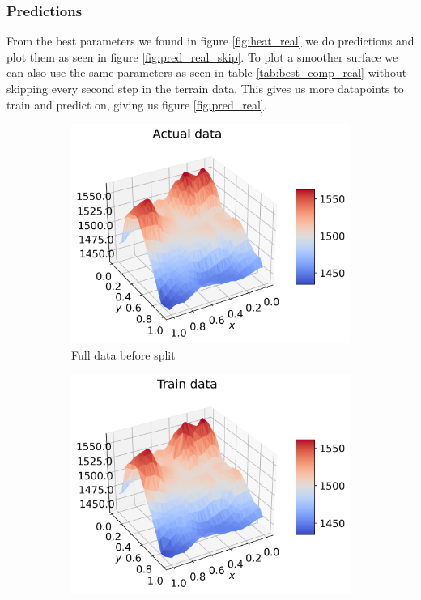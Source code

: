 \documentclass[12pt]{article}
\begin{document}
\subsubsection{Predictions}
From the best parameters we found in figure \ref{fig:heat_real} we do predictions and plot them as seen in figure \ref{fig:pred_real_skip}. To plot a smoother surface we can also use the same parameters as seen in table \ref{tab:best_comp_real} without skipping every second step in the terrain data. This gives us more datapoints to train and predict on, giving us figure \ref{fig:pred_real}.
\begin{figure}[H]
  \begin{subfigure}{.5\textwidth}
    \centering
    \includegraphics[width=\textwidth]{../figures/actual_data_n40_skip2.png}
    \caption{Full data before split}
    \label{fig:real_pred_real_skip}
  \end{subfigure}
  \begin{subfigure}{.5\textwidth}
    \centering
    \includegraphics[width=\textwidth]{../figures/train_data_n40_skip2.png}

\end{subfigure}
\end{figure}
\end{document}
